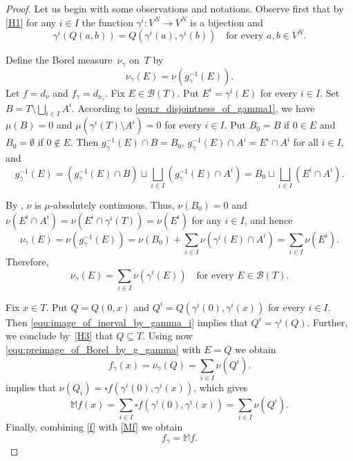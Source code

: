 \documentclass{amsart}
\theoremstyle{plain}%
\theoremstyle{definition}
\theoremstyle{remark}
\begin{document}
\begin{proof}  
Let us begin with some observations and notations. Observe first that by \ref{H1} for any $i\in I$ the function  $\gamma^i\colon V^N\to V^N$ is a bijection and
\begin{equation}\label{equ:image_of_inerval_by_gamma_i}
\gamma^i(Q(a,b))=Q(\gamma^i(a),\gamma^i(b))\quad\text{for every }a,b\in V^N.
\end{equation} 

Define the Borel measure~$\nu_\gamma$ on~$T$ by 
\begin{equation*}
\nu_\gamma(E)=\nu(g_\gamma^{-1}(E)).
\end{equation*}
Let $f=d_\nu$ and $f_\gamma=d_{\nu_\gamma}$. Fix $E\in \mathcal B(T)$. Put $E^i=\gamma^i(E)$ for every $i\in I$. Set $B=T\setminus\bigsqcup_{i\in I}A^i$. According to \eqref{equ:r_disjointness_of_gamma1}, we have $\mu(B)=0$ and $\mu(\gamma^i(T)\setminus A^i)=0$ for every $i\in I$. Put $B_0=B$ if $0\in E$ and $B_0=\emptyset$ if $0\notin E$. Then $g_\gamma^{-1}(E)\cap B=B_0$, $g_\gamma^{-1}(E)\cap A^i=E^i\cap A^i$ for all $i\in I$, and
\begin{equation*}
g_\gamma^{-1}(E)=(g_\gamma^{-1}(E)\cap B)
\sqcup\bigsqcup_{i\in I}(g_\gamma^{-1}(E)\cap A^i)
=B_0\sqcup\bigsqcup_{i\in I}(E^i\cap A^i).
\end{equation*}

By , $\nu$ is $\mu$-absolutely continuous. Thus, $\nu(B_0)=0$ and $\nu(E^i\cap A^i)=\nu(E^i\cap \gamma^i(T))=\nu(E^i)$ for any $i\in I$, and hence
\begin{equation*}
\nu_\gamma(E)=\nu(g_\gamma^{-1}(E))=\nu(B_0)+\sum_{i\in I}\nu(\gamma^i(E)\cap A^i)
=\sum_{i\in I}\nu(E^i).
\end{equation*}
Therefore,
\begin{equation}\label{equ:preimage_of_Borel_by_g_gamma}
\nu_\gamma(E)=\sum_{i\in I}\nu(\gamma^i(E))\quad\text{for every }E\in\mathcal{B}(T).
\end{equation}

Fix $x\in T$. Put $Q=Q(0,x)$ and $Q^i=Q(\gamma^i(0),\gamma^i(x))$ for every $i\in I$. 
Then \eqref{equ:image_of_inerval_by_gamma_i} implies that $Q^i=\gamma^i(Q)$.
Further, we conclude by~\cref{H3} that $Q\subseteq T$.
Using now \eqref{equ:preimage_of_Borel_by_g_gamma} with $E=Q$ we obtain
\begin{equation}\label{f}
f_\gamma(x)=\nu_\gamma(Q)=\sum_{i\in I}\nu(Q^i).
\end{equation}
 implies that $\nu(Q_i)=\square f(\gamma^i(0),\gamma^i(x))$, which gives
\begin{equation}\label{Mf}
\mathbb{M}f(x)=\sum_{i\in I}\square f(\gamma^i(0),\gamma^i(x))=\sum_{i\in I}\nu(Q^i).
\end{equation}
Finally, combining \eqref{f} with \eqref{Mf} we obtain
\begin{equation}\label{equ:distribution_of_phi_gamma}
f_\gamma=\mathbb{M}f.
\end{equation}


\end{proof}
\end{document}
